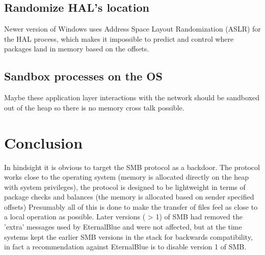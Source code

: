 \documentclass[
	letterpaper, %
	10pt, %
	unnumberedsections, %
	twoside, %
]{LTJournalArticle}
\begin{document}
\subsection{Randomize HAL's location}
Newer version of Windows uses Address Space Layout Randomization (ASLR) for the HAL process, which makes it impossible to predict and control where packages land in memory based on the offsets. 

\subsection{Sandbox processes on the OS}
Maybe these application layer interactions with the network should be sandboxed out of the heap so there is no memory cross talk possible. 


\section{Conclusion}
In hindsight it is obvious to target the SMB protocol as a backdoor. The protocol works close to the operating system (memory is allocated directly on the heap with system privileges), the protocol is designed to be lightweight in terms of package checks and balances (the memory is allocated based on sender specified offsets) Presumably all of this is done to make the transfer of files feel as close to a local operation as possible. Later versions ( > 1) of SMB had removed the 'extra' messages used by EternalBlue and were not affected, but at the time systems kept the earlier SMB versions in the stack for backwards compatibility, in fact a recommendation against EternalBlue is to disable version 1 of SMB.       




\printbibliography %




\end{document}

